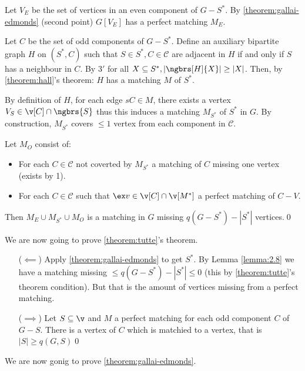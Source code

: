 \begin{prf}
    Let $V_E$ be the set of vertices in an even component of $G - S^*$. By \ref{theorem:gallai-edmonds} (second point) $G[V_E]$ has a perfect matching $M_E$.

    Let $C$ be the set of odd components of $G - S^*$. Define an auxiliary bipartite graph $H$ on $(S^*, C)$ such that $S \in S^*, C \in \mathcal{C}$ are adjacent in $H$ if and only if $S$ has a neighbour in $C$. By $3'$ for all $X \subseteq S^*, |\ngbrs[H]{X}| \geq |X|$. Then, by \ref{theorem:hall}'s theorem: $H$ has a matching $M$ of $S^*$.

    By definition of $H$, for each edge $sC \in M$, there exists a vertex $V_S \in \v[C] \cap \ngbrs{S}$ thus this induces a matching $M_{S^*}$ of $S^*$ in $G$. By construction, $M_{S^*}$ covers $\leq 1$ vertex from each component in $\mathcal{C}$.

    Let $M_O$ consist of:
    \begin{itemize}
        \item For each $C \in \mathcal{C}$ not coverted by $M_{S^*}$ a matching of $C$ missing one vertex (exists by 1).
        \item For each $C \in \mathcal{C}$ such that $\ex v \in \v[C] \cap \v[M^*]$ a perfect matching of $C - V$.
    \end{itemize}
    Then $M_E \cup M_{S^*} \cup M_O$ is a matching in $G$ missing $\mathit{q}(G - S^*) - |S^*|$ vertices.\qed
\end{prf}
\begin{prf}
    We are now going to prove \ref{theorem:tutte}'s theorem.
    \begin{itemize}
        \item[($\impliedby$)] Apply \ref{theorem:gallai-edmonds} to get $S^*$. By Lemma \ref{lemma:2.8} we have a matching missing $\leq \mathit{q}(G - S^*) - |S^*| \leq 0$ (this by \ref{theorem:tutte}'s theorem condition). But that is the amount of vertices missing from a perfect matching.
        \item[($\implies$)] Let $S \subseteq \v$ and $M$ a perfect matching for each odd component $C$ of $G - S$. There is a vertex of $C$ which is matchied to a vertex, that is $|S| \geq \mathit{q}(G, S)$\qed
    \end{itemize}
\end{prf}
We are now gonig to prove \ref{theorem:gallai-edmonds}.
